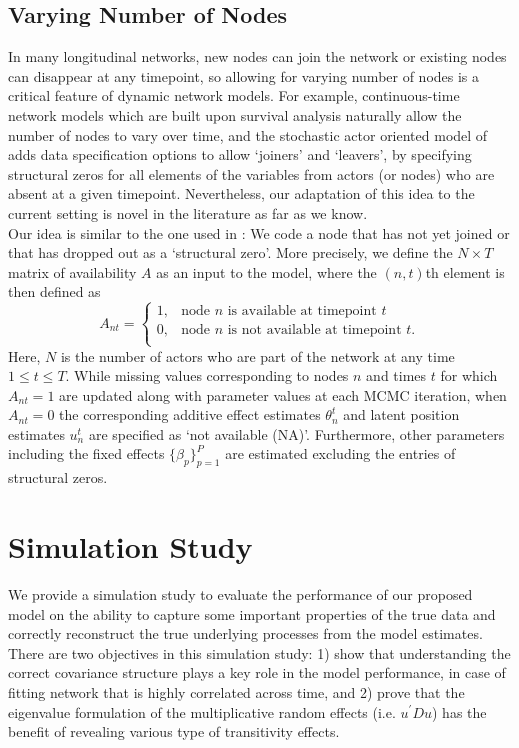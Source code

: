 \documentclass[a4paper]{article}
\begin{document}
\subsection{Varying Number of Nodes}\label{subsec: varying number of nodes}
In many longitudinal networks, new nodes can join the network or existing nodes can disappear at any timepoint, so allowing for varying number of nodes is a critical feature of dynamic network models. For example, continuous-time network models which are built upon survival analysis \citep{butts2008relational,vu2011continuous} naturally allow the number of nodes to vary over time, and the stochastic actor oriented model of \cite{snijders2010introduction} adds data specification options to allow `joiners' and `leavers', by specifying structural zeros for all elements of the variables from actors (or nodes) who are absent at a given timepoint. Nevertheless, our adaptation of this idea to the current setting is novel in the literature as far as we know.\\ \newline
Our idea is similar to the one used in \cite{snijders2010introduction}: We code a node that has not yet joined or that has dropped out as a `structural zero'. More precisely, we define the $N\times T$ matrix of availability $A$ as an input to the model, where the $(n, t)${th} element is then defined as
\begin{equation*}
A_{nt} =\begin{cases}
1, & \mbox{node $n$ is available at timepoint $t$}\\
0, & \mbox{node $n$ is not available at timepoint $t$.}\\
\end{cases}
\end{equation*}
Here, $N$ is the number of actors who are part of the network at any time $1\leq t \leq T$. While missing values corresponding to nodes $n$ and times $t$ for which $A_{nt} = 1$ are updated along with parameter values at each MCMC iteration, when $A_{nt} = 0$ the corresponding additive effect estimates $\theta^t_{n}$ and latent position estimates $u^t_{n}$ are specified as `not available (NA)'. Furthermore, other parameters including the fixed effects $\{\beta_{p}\}_{p=1}^P$ are estimated excluding the entries of structural zeros. 

\section{Simulation Study}\label{sec: simulation study}
We provide a simulation study to evaluate the performance of our proposed model on the ability to capture some important properties of the true data and correctly reconstruct the true underlying processes from the model estimates. There are two objectives in this simulation study: 1) show that understanding the correct covariance structure plays a key role in the model performance, in case of fitting network that is highly correlated across time, and 2) prove that the eigenvalue formulation of the multiplicative random effects (i.e. $u^\prime Du$) has the benefit of revealing various type of transitivity effects.
\end{document}
